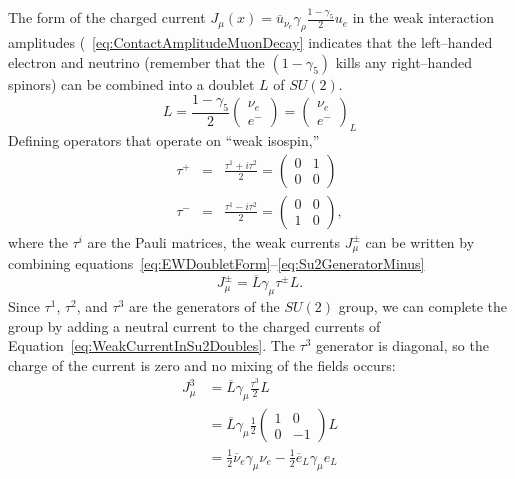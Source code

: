 The form of the charged current $J_\mu(x) = \overline u_{\nu_e} \gamma_\rho
\frac{1 - \gamma_5}{2} u_e$ in the weak interaction amplitudes
(~\ref{eq:ContactAmplitudeMuonDecay} indicates that the left--handed electron
and neutrino 
(remember that the $(1-\gamma_5)$ kills any right--handed spinors) can be
combined into a doublet $L$ of $SU(2)$.  
\begin{equation}
  L = \frac{1 - \gamma_5}{2}
  \left(\begin{array}{c} \nu_e \\ e^- \end{array}\right)
    = \left(\begin{array}{c} \nu_e \\ e^- \end{array}\right)_L
      \label{eq:EWDoubletForm}
\end{equation}
Defining operators that operate on ``weak isospin,''
\begin{eqnarray}
  \tau^+ &=& \frac{\tau^1 + i \tau^2}{2} = 
  \left(\begin{array}{cc} 0 & 1 \\ 0 & 0 \end{array}\right) 
    \label{eq:Su2GeneratorPlus} \\
  \tau^- &=& \frac{\tau^1 - i \tau^2}{2} = 
  \left(\begin{array}{cc} 0 & 0 \\ 1 & 0 \end{array}\right),
    \label{eq:Su2GeneratorMinus}
\end{eqnarray}
where the $\tau^i$ are the Pauli matrices, the weak currents $J_\mu^\pm$ can be
written by combining
equations~\ref{eq:EWDoubletForm}--\ref{eq:Su2GeneratorMinus}
\begin{equation}
  J_\mu^\pm = \overline L \gamma_\mu \tau^\pm L.
  \label{eq:WeakCurrentInSu2Doublets}
\end{equation}
Since $\tau^1$, $\tau^2$, and $\tau^3$ are the generators of the $SU(2)$ group,
we can complete the group by adding a neutral current to the charged currents of
Equation~\ref{eq:WeakCurrentInSu2Doubles}.  The $\tau^3$ generator is diagonal,
so the charge of the current is zero and no mixing of the fields occurs:
\begin{eqnarray}
  J^3_\mu &= \overline L \gamma_\mu \frac{\tau^3}{2} L \nonumber \\
  &= \overline L \gamma_\mu  \frac{1}{2} 
  \left(\begin{array}{cc} 1 & 0 \\ 0 & -1 \end{array}\right) L \nonumber \\
    &=  \frac{1}{2} \overline \nu_e \gamma_\mu \nu_e - \frac{1}{2} \overline e_L
    \gamma_\mu e_L 
    \label{eq:EWNeutralCurrent}
\end{eqnarray}

